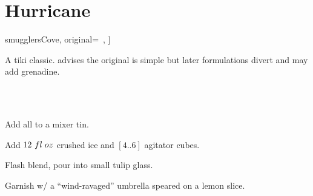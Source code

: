 \section[Hurricane]{Hurricane}


\begin{recipestats}[
	servings=1,
	preptime=5~\minute,
	source=\citeauthor{smugglersCove}~\cite[p.~68]{smugglersCove},
	original=\citeauthor{beachbumBerryRemixed}~\cite{beachbumBerryRemixed},
]
\end{recipestats}


\begin{recipeabstract}
	A tiki classic.
	\citeauthor{smugglersCove} advises the original is simple but later formulations divert and may add grenadine.
\end{recipeabstract}


\begin{ingredientcolumns}[1]
	\begin{ingredientblock}
		\\
		\\
	\end{ingredientblock}
\end{ingredientcolumns}


\begin{preparation}
	\item Add all to a mixer tin.
	\item Add $12~fl\;oz$ crushed ice and $[4..6]$ agitator cubes.
	\item Flash blend, pour into small tulip glass.
	\item Garnish w/ a ``wind-ravaged'' umbrella speared on a lemon slice.
\end{preparation}


\recipeend%
